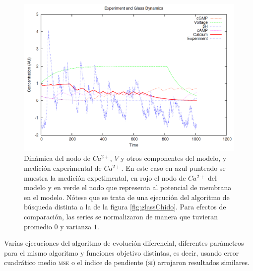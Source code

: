 \begin{figure}[h]
\includegraphics[width=0.9\linewidth]{gfx/glassChafa}
\caption[Dinámica de $Ca^{2+}$, $V$ y otros componentes del modelo, y medición experimental de $Ca^{2+}$]{Dinámica del nodo de $Ca^{2+}$, $V$ y otros componentes del modelo, y medición experimental de $Ca^{2+}$. En este caso en azul punteado se muestra la medición expetimental, en rojo el nodo de $Ca^{2+}$ del modelo y en verde el nodo que representa al potencial de membrana en el modelo. Nótese que se trata de una ejecución del algoritmo de búsqueda distinta a la de la figura \ref{fig:glassChido}. Para efectos de comparación, las series se normalizaron de manera que tuvieran promedio $0$ y varianza $1$.}\label{fig:glassChafa}
\end{figure}

Varias ejecuciones del algoritmo de evolución diferencial, diferentes parámetros para el mismo algoritmo y funciones objetivo distintas, es decir, usando error cuadrático medio \textsc{mse} o el índice de pendiente \textsc{(si)} arrojaron resultados similares.












































